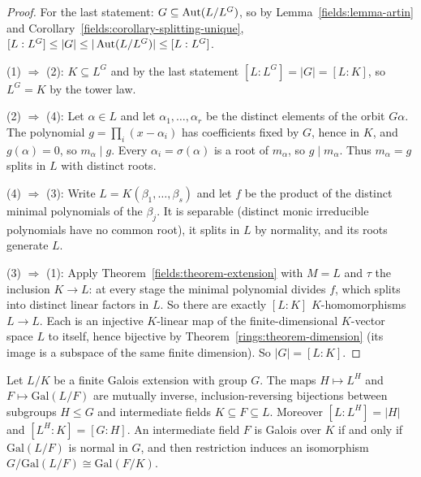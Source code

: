 \begin{proof}
For the last statement: $G \subseteq \operatorname{Aut}(L/L^G)$, so by Lemma~\ref{fields:lemma-artin} and
Corollary~\ref{fields:corollary-splitting-unique},
$[L : L^G] \leq |G| \leq |\operatorname{Aut}(L/L^G)| \leq [L : L^G]$.

(1) $\Rightarrow$ (2): $K \subseteq L^G$ and by the last statement $[L : L^G] = |G| = [L : K]$, so
$L^G = K$ by the tower law.

(2) $\Rightarrow$ (4): Let $\alpha \in L$ and let $\alpha_1, \ldots, \alpha_r$ be the distinct elements of the
orbit $G\alpha$. The polynomial $g = \prod_i (x - \alpha_i)$ has coefficients fixed by $G$, hence in
$K$, and $g(\alpha) = 0$, so $m_\alpha \mid g$. Every $\alpha_i = \sigma(\alpha)$ is a root of $m_\alpha$, so $g \mid m_\alpha$.
Thus $m_\alpha = g$ splits in $L$ with distinct roots.

(4) $\Rightarrow$ (3): Write $L = K(\beta_1, \ldots, \beta_s)$ and let $f$ be the product of the distinct
minimal polynomials of the $\beta_j$. It is separable (distinct monic irreducible
polynomials have no common root), it splits in $L$ by normality, and its roots
generate $L$.

(3) $\Rightarrow$ (1): Apply Theorem~\ref{fields:theorem-extension} with $M = L$ and $\tau$ the
inclusion $K \to L$: at every stage the minimal polynomial divides $f$, which splits into
distinct linear factors in $L$. So there are exactly $[L : K]$ $K$-homomorphisms $L \to L$.
Each is an injective $K$-linear map of the finite-dimensional $K$-vector space $L$ to itself,
hence bijective by Theorem~\ref{rings:theorem-dimension} (its image is a subspace of the
same finite dimension). So $|G| = [L : K]$.
\end{proof}

\begin{theorem}\label{fields:theorem-fundamental}
Let $L/K$ be a finite Galois extension with group $G$. The maps $H \mapsto L^H$ and
$F \mapsto \mathrm{Gal}(L/F)$ are mutually inverse, inclusion-reversing bijections between
subgroups $H \leq G$ and intermediate fields $K \subseteq F \subseteq L$. Moreover
$[L : L^H] = |H|$ and $[L^H : K] = [G : H]$. An intermediate field $F$ is Galois over $K$ if
and only if $\mathrm{Gal}(L/F)$ is normal in $G$, and then restriction induces an isomorphism
$G/\mathrm{Gal}(L/F) \cong \mathrm{Gal}(F/K)$.
\end{theorem}

